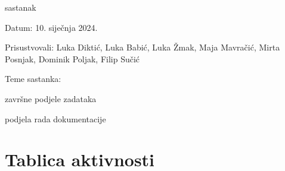 \begin{packed_enum}
			\item  sastanak
			\item[] \begin{packed_item}
				\item Datum: 10. siječnja 2024.
				\item Prisustvovali: Luka Diktić, Luka Babić, Luka Žmak, Maja Mavračić, Mirta Posnjak, Dominik Poljak, Filip Sučić
				\item Teme sastanka:
				\begin{packed_item}
					\item  završne podjele zadataka
					\item  podjela rada dokumentacije
				\end{packed_item}
			\end{packed_item}
			
			
		\end{packed_enum}
		
		\eject
		\section*{Tablica aktivnosti}
		
			

